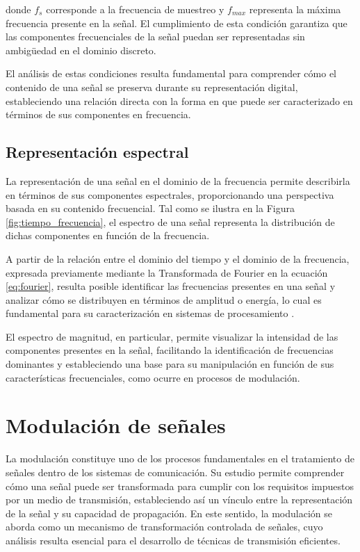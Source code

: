 donde $f_s$ corresponde a la frecuencia de muestreo y $f_{max}$ representa la máxima frecuencia presente en la señal. El cumplimiento de esta condición garantiza que las componentes frecuenciales de la señal puedan ser representadas sin ambigüedad en el dominio discreto.

El análisis de estas condiciones resulta fundamental para comprender cómo el contenido de una señal se preserva durante su representación digital, estableciendo una relación directa con la forma en que puede ser caracterizado en términos de sus componentes en frecuencia.


\subsection{Representación espectral}

La representación de una señal en el dominio de la frecuencia permite describirla en términos de sus componentes espectrales, proporcionando una perspectiva basada en su contenido frecuencial. Tal como se ilustra en la Figura \ref{fig:tiempo_frecuencia}, el espectro de una señal representa la distribución de dichas componentes en función de la frecuencia.

A partir de la relación entre el dominio del tiempo y el dominio de la frecuencia, expresada previamente mediante la Transformada de Fourier en la ecuación \eqref{eq:fourier}, resulta posible identificar las frecuencias presentes en una señal y analizar cómo se distribuyen en términos de amplitud o energía, lo cual es fundamental para su caracterización en sistemas de procesamiento \cite{lathi2009modern}.

El espectro de magnitud, en particular, permite visualizar la intensidad de las componentes presentes en la señal, facilitando la identificación de frecuencias dominantes y estableciendo una base para su manipulación en función de sus características frecuenciales, como ocurre en procesos de modulación.



\section{Modulación de señales}

La modulación constituye uno de los procesos fundamentales en el tratamiento de señales dentro de los sistemas de comunicación. Su estudio permite comprender cómo una señal puede ser transformada para cumplir con los requisitos impuestos por un medio de transmisión, estableciendo así un vínculo entre la representación de la señal y su capacidad de propagación. En este sentido, la modulación se aborda como un mecanismo de transformación controlada de señales, cuyo análisis resulta esencial para el desarrollo de técnicas de transmisión eficientes.

